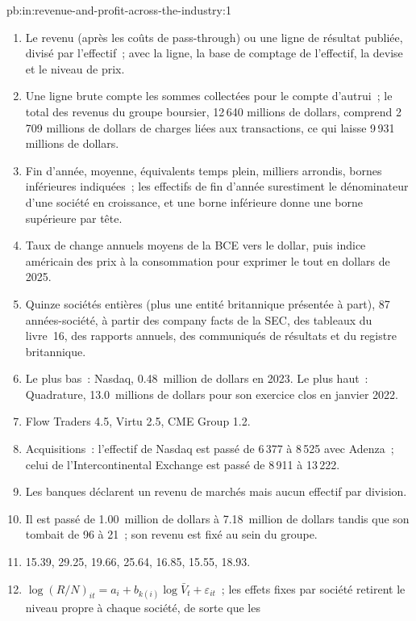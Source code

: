 \begin{solution}{pb:in:revenue-and-profit-across-the-industry:1}
\begin{enumerate}
\item Le revenu (après les coûts de pass-through) ou une ligne de résultat publiée, divisé par l'effectif~; avec la ligne, la base de comptage de l'effectif,
la devise et le niveau de prix.
\item Une ligne brute compte les sommes collectées pour le compte d'autrui~; le total des revenus du groupe boursier, 12\,640 millions de dollars, comprend
2\,709 millions de dollars de charges liées aux transactions, ce qui laisse 9\,931 millions de dollars.
\item Fin d'année, moyenne, équivalents temps plein, milliers arrondis, bornes inférieures indiquées~; les effectifs de fin d'année surestiment le
dénominateur d'une société en croissance, et une borne inférieure donne une borne supérieure par tête.
\item Taux de change annuels moyens de la BCE vers le dollar, puis indice américain des prix à la consommation pour exprimer le tout en dollars de 2025.
\item Quinze sociétés entières (plus une entité britannique présentée à part), 87 années-société, à partir des company facts de la SEC, des tableaux du livre~16,
des rapports annuels, des communiqués de résultats et du registre britannique.
\item Le plus bas~: Nasdaq, 0.48~million de dollars en 2023. Le plus haut~: Quadrature, 13.0~millions de dollars pour son exercice clos en janvier 2022.
\item Flow Traders 4.5, Virtu 2.5, CME Group 1.2.
\item Acquisitions~: l'effectif de Nasdaq est passé de 6\,377 à 8\,525 avec Adenza~; celui de l'Intercontinental Exchange est passé de
8\,911 à 13\,222.
\item Les banques déclarent un revenu de marchés mais aucun effectif par division.
\item Il est passé de 1.00~million de dollars à 7.18~million de dollars tandis que son  tombait de 96 à 21~; son revenu est fixé au sein
du groupe.
\item 15.39, 29.25, 19.66, 25.64, 16.85, 15.55, 18.93.
\item $\log(R/N)_{it}=a_i+b_{k(i)}\log\bar V_t+\varepsilon_{it}$~; les effets fixes par société retirent le niveau propre à chaque société, de sorte que les

\end{enumerate}
\end{solution}
